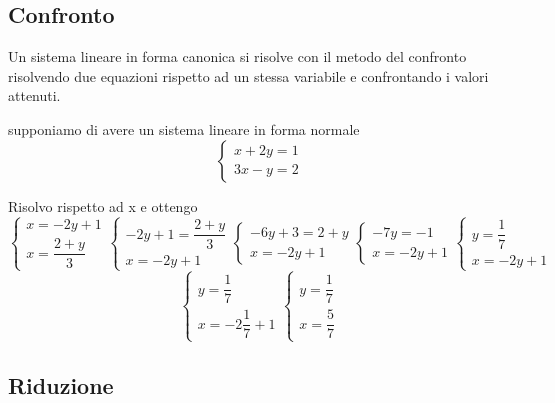 \subsection{Confronto}
\label{sec:Confronto}
Un sistema lineare in forma canonica si risolve con il metodo del confronto risolvendo due equazioni rispetto ad un stessa variabile e confrontando i valori attenuti.
\begin{esempiot}{}{}
supponiamo di avere un sistema lineare in forma normale
\[
\begin{cases}
	x+2y=1\\
	3x-y=2
\end{cases}
\]
\end{esempiot}
Risolvo rispetto ad x e ottengo
\[
\begin{cases}
	x=-2y+1\\
	x=\dfrac{2+y}{3}
\end{cases}
\begin{cases}
	-2y+1=\dfrac{2+y}{3}\\
		x=-2y+1
\end{cases}
\begin{cases}
	-6y+3=2+y\\
	x=-2y+1
\end{cases}
\begin{cases}
	-7y=-1\\
	x=-2y+1
\end{cases}
\begin{cases}
	y=\dfrac{1}{7}\\
	x=-2y+1
\end{cases}
\]
\[
\begin{cases}
	y=\dfrac{1}{7}\\
	x=-2\dfrac{1}{7}+1
\end{cases}
\begin{cases}
	y=\dfrac{1}{7}\\
	x=\dfrac{5}{7}
\end{cases}
\]

\subsection{Riduzione}
\label{sec:Riduzione}
